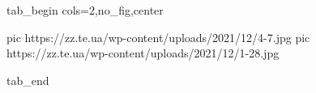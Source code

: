  
 
 
 
 

\ifcmt
  tab_begin cols=2,no_fig,center

     pic https://zz.te.ua/wp-content/uploads/2021/12/4-7.jpg
		 pic https://zz.te.ua/wp-content/uploads/2021/12/1-28.jpg

  tab_end
\fi
